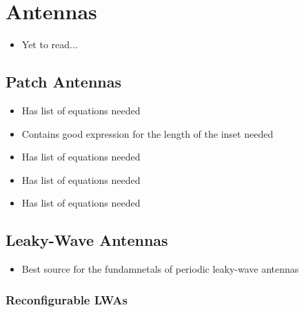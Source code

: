 \chapter{Antennas}

\begin{itemize}
    \item Yet to read... 
\end{itemize}

\section{Patch Antennas}

\begin{itemize}
    \item Has list of equations needed
    \item Contains good expression for the length of the inset needed
\end{itemize}

\begin{itemize}
    \item Has list of equations needed
\end{itemize}

\begin{itemize}
    \item Has list of equations needed
\end{itemize}

\begin{itemize}
    \item Has list of equations needed
\end{itemize}

\section{Leaky-Wave Antennas}

\begin{itemize}
    \item Best source for the fundamnetals of periodic leaky-wave antennas
\end{itemize}

\subsection{Reconfigurable LWAs}
